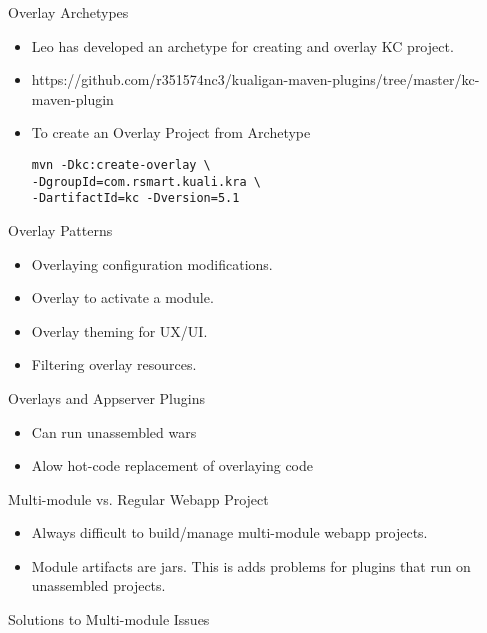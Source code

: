 \documentclass[xcolor=dvipsnames,14pt]{beamer}
\begin{document}
\begin{frame}[fragile]{Overlay Archetypes}
  \begin{itemize}
  \item Leo has developed an archetype for creating and overlay KC project.
  \item https://github.com/r351574nc3/kualigan-maven-plugins/tree/master/kc-maven-plugin
  \item To create an Overlay Project from Archetype
  \begin{verbatim}
mvn -Dkc:create-overlay \
-DgroupId=com.rsmart.kuali.kra \
-DartifactId=kc -Dversion=5.1
  \end{verbatim}
  \end{itemize}
\end{frame}

\begin{frame}{Overlay Patterns}
  \begin{itemize}
    \item Overlaying configuration modifications.
    \item Overlay to activate a module.
    \item Overlay theming for UX/UI.
    \item Filtering overlay resources.
  \end{itemize}
\end{frame}

\begin{frame}[fragile]{Overlays and Appserver Plugins}
\begin{itemize}
\item Can run unassembled wars
\item Alow hot-code replacement of overlaying code
\end{itemize}
\end{frame}

\begin{frame}{Multi-module vs. Regular Webapp Project}
  \begin{itemize}
    \item Always difficult to build/manage multi-module webapp
      projects.
    \item Module artifacts are jars. This is adds problems for plugins that run on unassembled projects.
  \end{itemize}
\end{frame}

\begin{frame}{Solutions to Multi-module Issues}
\end{frame}
\end{document}
